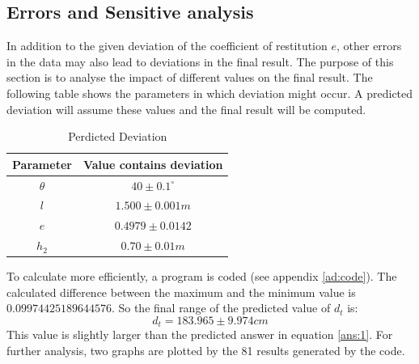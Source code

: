 \documentclass{article}
\begin{document}
    \subsection{Errors and Sensitive analysis}
    In addition to the given deviation of the coefficient of restitution $e$, other errors in the data may also lead to deviations in the final result. The purpose of this section is to analyse the impact of different values on the final result. The following table shows the parameters in which deviation might occur. A predicted deviation will assume these values and the final result will be computed.
    \begin{table}[H]
                \caption {Perdicted Deviation} \label{tb:deviation} 
                \begin{center}
                    \begin{tabular}{cc}
                        \hline
                        Parameter & Value contains deviation \\
                        \hline
                        $\theta$     & $40\pm0.1^ \circ$     \\
                        $l$         & $1.500\pm 0.001m$     \\
                        $e$         & $0.4979 \pm 0.0142$     \\
                        $h_2$        & $0.70\pm0.01m$     \\
                        \hline
                    \end{tabular}
                \end{center}
            \end{table}
    To calculate more efficiently, a program is coded (see appendix \ref{ad:code}).
    The calculated difference between the maximum and the minimum value is $0.09974425189644576$. So the final range of the predicted value of $d_t$ is:
    $$d_t = 183.965\pm9.974cm$$
    This value is slightly larger than the predicted answer in equation \ref{ans:1}. For further analysis, two graphs are plotted by the 81 results generated by the code. 
\end{document}
